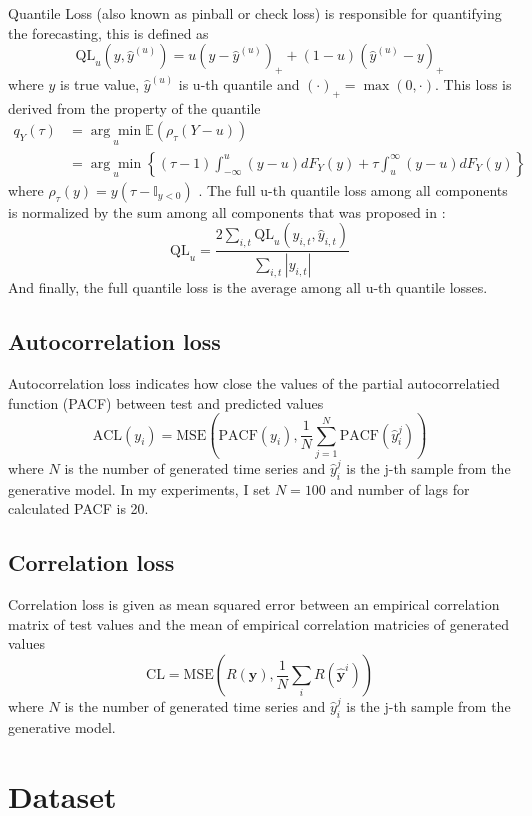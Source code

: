 \documentclass[12pt,a4paper]{article}
\begin{document}
Quantile Loss (also known as pinball or check loss) is responsible for quantifying the forecasting, this is defined as 
$$\text{QL}_{u}\left(y, \hat{y}^{(u)}\right)=u\left(y-\hat{y}^{(u)}\right)_{+}+(1-u)\left(\hat{y}^{(u)}-y\right)_{+}$$
where $y$ is true value, $\hat y^{(u)}$ is u-th quantile and $(\cdot)_+ = \max(0, \cdot)$.
This loss is derived from the property of the quantile
$$
\begin{aligned}
q_{Y}(\tau) &=\underset{u}{\arg \min } \mathbb E\left(\rho_{\tau}(Y-u)\right)\\
&=\underset{u}{\arg \min }\left\{(\tau-1) \int_{-\infty}^{u}(y-u) d F_{Y}(y)+\tau \int_{u}^{\infty}(y-u) d F_{Y}(y)\right\}    
\end{aligned}$$
where $\rho_{\tau}(y) = y(\tau - \mathbb I_{y<0})$ \cite{Koenker2005}. The full u-th quantile loss among all components is normalized by the sum among all components that was proposed in \cite{gaussiantcn2020}:
$$\text{QL}_u = \frac{2 \sum_{i,t} \text{QL}_u(y_{i,t}, \hat y_{i,t})}{\sum_{i,t} |y_{i, t}|}$$
And finally, the full quantile loss is the average among all u-th quantile losses.

\subsection{Autocorrelation loss}

Autocorrelation loss indicates how close the values of the partial autocorrelatied function (PACF) between test and predicted values
$$\text{ACL} (y_{i}) = \text{MSE}
\left(\text{PACF}(y_i), \frac{1}{N} \sum_{j=1}^N \text{PACF}(\hat y_i^j) \right)
$$
where $N$ is the number of generated time series and $\hat y_{i}^j$ is the j-th sample from the generative model. In my experiments, I set $N=100$ and number of lags for calculated PACF is 20.

\subsection{Correlation loss}

Correlation loss is given as mean squared error between an empirical correlation matrix of test values and the mean of empirical correlation matricies of generated values
$$\text{CL} = \text{MSE} \left( R (\mathbf y), \frac{1}{N} \sum_i  R(\hat{\mathbf y}^i) \right)$$
where $N$ is the number of generated time series and $\hat y_{i}^j$ is the j-th sample from the generative model.

\section{Dataset}
\end{document}
